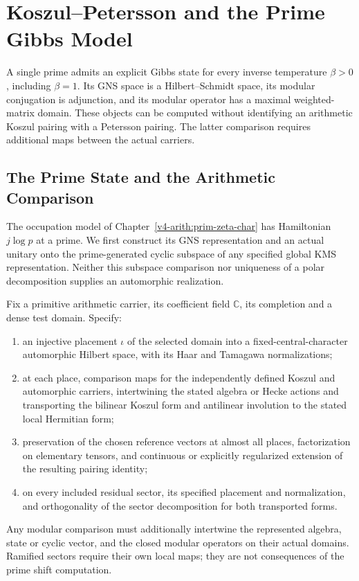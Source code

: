 \chapter[Koszul--Petersson and the Prime Gibbs Model][Prime Gibbs model and pairings]{Koszul--Petersson and the Prime Gibbs Model}
\label{v4-arith:kms-gns-full}

A single prime admits an explicit Gibbs state for every inverse
temperature \(\beta>0\), including \(\beta=1\). Its GNS space is a
Hilbert--Schmidt space, its modular conjugation is adjunction, and
its modular operator has a maximal weighted-matrix domain. These
objects can be computed without identifying an arithmetic Koszul
pairing with a Petersson pairing. The latter comparison requires
additional maps between the actual carriers.

\section{The Prime State and the Arithmetic Comparison}
\label{v4-arith:kms-gns:statement-table}
\label{v4-arith:kms-gns:residuals}
\label{v4-arith:kms-gns:consequences}
\label{v4-arith:kms-gns:P3-consequence}
\label{v4-arith:kms-gns:table}

The occupation model of Chapter~\ref{v4-arith:prim-zeta-char} has
Hamiltonian \(j\log p\) at a prime. We first construct its GNS
representation and an actual unitary onto the prime-generated
cyclic subspace of any specified global KMS representation.
Neither this subspace comparison nor uniqueness of a polar
decomposition supplies an automorphic realization.

\begin{hypothesis}
\label{v4-arith:kms-gns:hyp:arithmetic-pairing}
Fix a primitive arithmetic carrier, its coefficient field
\(\mathbb C\), its completion and a dense test domain. Specify:
\begin{enumerate}
\item an injective placement \(\iota\) of the selected domain into a
fixed-central-character automorphic Hilbert space, with its Haar
and Tamagawa normalizations;
\item at each place, comparison maps for the independently defined
Koszul and automorphic carriers, intertwining the stated algebra
or Hecke actions and transporting the bilinear Koszul form and
antilinear involution to the stated local Hermitian form;
\item preservation of the chosen reference vectors at almost all
places, factorization on elementary tensors, and continuous or
explicitly regularized extension of the resulting pairing identity;
\item on every included residual sector, its specified placement and
normalization, and orthogonality of the sector decomposition for
both transported forms.
\end{enumerate}
Any modular comparison must additionally intertwine the represented
algebra, state or cyclic vector, and the closed modular operators
on their actual domains. Ramified sectors require their own local
maps; they are not consequences of the prime shift computation.
\end{hypothesis}

